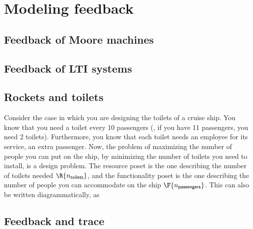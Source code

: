 
\section{Modeling feedback}
\label{sec:modeling-feedback}


\subsection{Feedback of Moore machines}


\subsection{Feedback of LTI systems}


\subsection{Rockets and toilets}

Consider the case in which you are designing the toilets of a cruise ship.
You know that you need a toilet every 10 passengers (\ie , if you have 11 passengers, you need 2 toilets).
Furthermore, you know that each toilet needs an employee for its service, \ie an extra passenger.
Now, the problem of maximizing the number of people you can put on the ship, by minimizing the number of toilets you need to install, is a design problem.
The resource poset is the one describing the number of toilets needed $\R{n_\mathsf{toilets}}$, and the functionality poset is the one describing the number of people you can accommodate on the ship $\F{n_\mathsf{passengers}}$.
This can also be written diagrammatically, as


\subsection{Feedback and trace}


